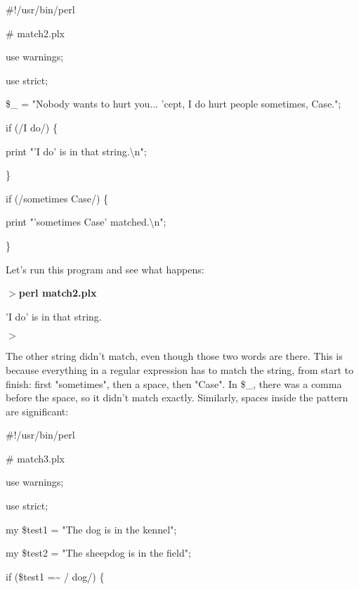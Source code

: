 \documentclass[a4paper,11pt]{book}
\begin{document}
\noindent 

\noindent 

\noindent \#!/usr/bin/perl

\noindent \# match2.plx

\noindent use warnings;

\noindent use strict;

\noindent 

\noindent \$\_  = "Nobody wants to hurt you... 'cept, I do hurt people sometimes, Case.";

\noindent 

\noindent if (/I do/) \{

\noindent print "'I do' is in that string.\textbackslash n";

\noindent \}

\noindent 

\noindent if (/sometimes Case/) \{

\noindent print "'sometimes Case' matched.\textbackslash n";

\noindent \}

\noindent 

\noindent Let's run this program and see what happens:

\noindent 

\noindent $>$\textbf{perl match2.plx}

\noindent 'I do' is in that string.

\noindent $>$

\noindent 

\noindent The other string didn't match, even though those two words are there. This is because everything in a regular expression has to match the string, from start to finish: first "sometimes", then a space, then "Case". In \$\_, there was a comma before the space, so it didn't match exactly. Similarly, spaces inside the pattern are significant:

\noindent 

\noindent \#!/usr/bin/perl

\noindent \# match3.plx

\noindent use warnings;

\noindent use strict;

\noindent 

\noindent my \$test1 = "The dog is in the kennel";

\noindent my \$test2 = "The sheepdog is in the field";

\noindent 

\noindent if (\$test1 =\~{} / dog/) \{
\end{document}
